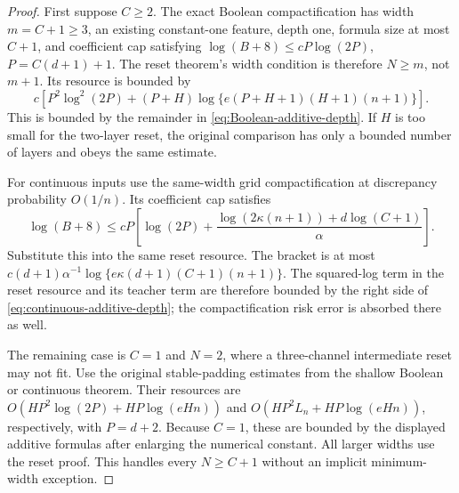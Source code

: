 \begin{proof}
First suppose $C\ge2$. The exact Boolean compactification has width $m=C+1\ge3$, an existing constant-one feature, depth one, formula size at most $C+1$, and coefficient cap satisfying
$\log(B+8)\le cP\log(2P)$, $P=C(d+1)+1$.
The reset theorem's width condition is therefore $N\ge m$, not $m+1$. Its resource is bounded by
\[
 c\left[P^2\log^2(2P)
       +(P+H)\log\{e(P+H+1)(H+1)(n+1)\}\right].
\]
This is bounded by the remainder in \eqref{eq:Boolean-additive-depth}. If $H$ is too small for the two-layer reset, the original comparison has only a bounded number of layers and obeys the same estimate.

For continuous inputs use the same-width grid compactification at discrepancy probability $O(1/n)$. Its coefficient cap satisfies
\[
 \log(B+8)\le cP\left[\log(2P)+
       \frac{\log(2\kappa(n+1))+d\log(C+1)}\alpha\right].
\]
Substitute this into the same reset resource. The bracket is at most
$c(d+1)\alpha^{-1}\log\{e\kappa(d+1)(C+1)(n+1)\}$.
The squared-log term in the reset resource and its teacher term are therefore bounded by the right side of \eqref{eq:continuous-additive-depth}; the compactification risk error is absorbed there as well.

The remaining case is $C=1$ and $N=2$, where a three-channel intermediate reset may not fit. Use the original stable-padding estimates from the shallow Boolean or continuous theorem. Their resources are
$O(HP^2\log(2P)+HP\log(eHn))$ and
$O(HP^2L_n+HP\log(eHn))$, respectively, with $P=d+2$.
Because $C=1$, these are bounded by the displayed additive formulas after enlarging the numerical constant. All larger widths use the reset proof. This handles every $N\ge C+1$ without an implicit minimum-width exception.
\end{proof}
